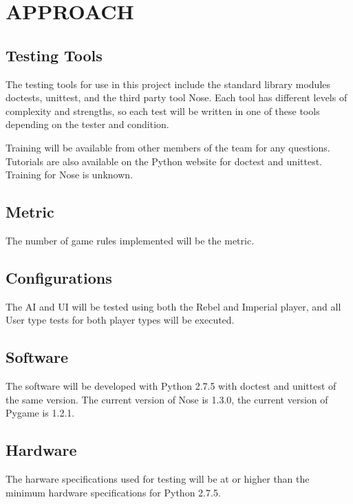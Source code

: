 \documentclass[report]{article}
\begin{document}
\section[APPROACH]{APPROACH}
\subsection{Testing Tools}
The testing tools for use in this project include the standard library modules doctests, unittest, and the third party tool Nose. Each tool has different levels of complexity and strengths, so each test will be written in one of these tools depending on the tester and condition.

Training will be available from other members of the team for any questions. Tutorials are also available on the Python website for doctest and unittest. Training for Nose is unknown.

\subsection{Metric}
The number of game rules implemented will be the metric.

\subsection{Configurations}
The AI and UI will be tested using both the Rebel and Imperial player, and all User type tests for both player types will be executed.

\subsection{Software}
The software will be developed with Python 2.7.5 with doctest and unittest of the same version. The current version of Nose is 1.3.0, the current version of Pygame is 1.2.1.
\subsection{Hardware}
The harware specifications used for testing will be at or higher than the minimum hardware specifications for Python 2.7.5.
\end{document}
